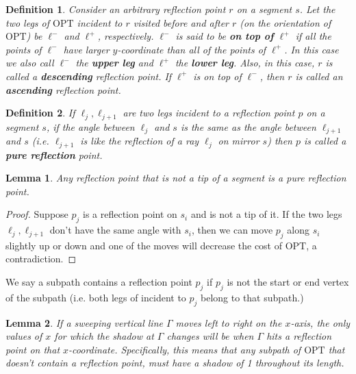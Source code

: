 \documentclass[10pt,a4paper]{amsart}
\theoremstyle{thmstyleone}
\newtheorem{lemma}{Lemma}
\newtheorem{definition}{Definition} %
\newcommand{\OPT}{{\text{OPT}}}
\begin{document}
\begin{definition}\label{def:ascending}
    Consider an arbitrary reflection point $r$ on a segment $s$. Let the two legs of $\OPT$ incident to $r$ visited before and after $r$ (on the orientation of $\OPT$) be $ \ell^- $ and $ \ell^+ $, respectively.
    $\ell^-$ is said to be \textbf{on top of} $\ell^+$  if all the points of $\ell^-$ have larger $y$-coordinate than all of the points of $\ell^+$. 
    In this case we also call $\ell^-$ the \textbf{upper leg} and $\ell^+$ the \textbf{lower leg}.
    Also, in this case, $r$ is called a \textbf{descending} reflection point.
    If $\ell^+ $ is on top of $\ell^- $, then $r$ is called an \textbf{ascending} reflection point.
\end{definition}

\begin{definition}
    If $\ell_j,\ell_{j+1}$ are two legs incident to a reflection point $p$ on a segment $s$, if 
    the angle between $\ell_j$ and $s$ is the same as the angle between $\ell_{j+1}$ and $s$ (i.e. $\ell_{j+1}$ is like the reflection of a ray $\ell_j$ on mirror $s$) then $p$ is called a \textbf{pure reflection} point.
\end{definition}

\begin{lemma}\label{obs:break-on-tip}
    Any reflection point that is not a tip of a segment is a pure reflection point.
\end{lemma}

\begin{proof}
    Suppose $p_j$ is a reflection point on $s_i$ and is not a tip of it. If the two legs $\ell_j,\ell_{j+1}$ don't have the same angle with $s_i$, then we
    can move $p_j$ along $s_i$ slightly up or down and one of the moves will decrease the cost of $\OPT$, a contradiction.
\end{proof}

We say a subpath contains a reflection point $p_j$ if $p_j$ is not the start or end vertex of the subpath (i.e. both legs of incident to $p_j$ belong to that subpath.)

\begin{lemma}\label{obs:shadow-increase}
    If a sweeping vertical line $\Gamma$ moves left to right on the $ x $-axis, the only values of $x$ for which the shadow at $\Gamma$ changes will be when $\Gamma$ hits a reflection point on that $x$-coordinate. Specifically, this means that any subpath of $\OPT$ that doesn't contain a reflection point, must have a shadow of 1 throughout its length. 
\end{lemma}
\end{document}
